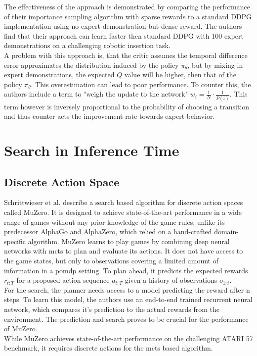 The effectiveness of the approach is demonstrated by comparing the performance of their importance sampling algorithm with sparse rewards to a standard DDPG 
implementation using no expert demonstration but dense reward. The authors find that their approach can learn faster then standard DDPG with 100 expert 
demonstrations on a challenging robotic insertion task.\\ 
A problem with this approach is, that the critic assumes the temporal difference error approximates the distribution induced by the policy $\pi_{\theta}$, but by 
mixing in expert demonstrations, the expected $Q$ value will be higher, then that of the policy $\pi_{\theta}$. This overestimation can lead to poor performance. 
To counter this, the authors include a term to "weigh the update to the network" $w_i = \frac{1}{N} \cdot \frac{1}{P(i)}$. This term however is inversely proportional to the 
probability of choosing a transition and thus counter acts the improvement rate towards expert behavior. 

\section{Search in Inference Time}
\subsection{Discrete Action Space}

Schrittwieser et al. \cite{MUZero} describe a search based algorithm for discrete action spaces called MuZero. It is designed to achieve state-of-the-art performance 
in a wide range of games without any prior knowledge of the game rules, unlike its predecessor AlphaGo and AlphaZero, which relied on a hand-crafted 
domain-specific algorithm. MuZero learns to play games by combining deep neural networks with \ac{mcts} to plan and evaluate its actions. 
It does not have access to the game states, but only to observations covering a limited amount of information in a \ac{pomdp} setting.
To plan ahead, it predicts the expected rewards $r_{t:T}$ for a proposed action sequence $a_{t:T}$ given a history of observations $o_{1:t}$.\\
For the search, the planner needs access to a model predicting the reward after n steps. To learn this model, the authors use an end-to-end trained recurrent neural network, which 
compares it's prediction to the actual rewards from the environment. The prediction and search proves to be crucial for the performance of MuZero.\\ 
While MuZero achieves state-of-the-art performance on the challenging ATARI 57 benchmark, it requires discrete actions for the \ac{mcts} based algorithm.

